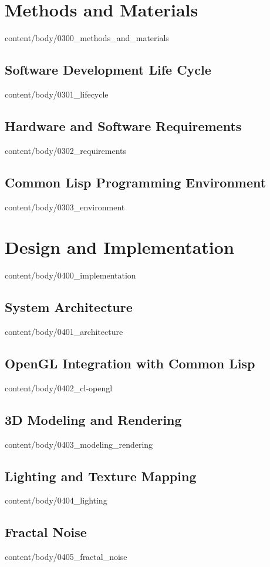 \documentclass[english, tfg, loc, lof, firstnumbered, epsbased]{tfgtfmthesisuam}
\begin{document}
\chapter{Methods and Materials}{content/body/0300_methods_and_materials}            %
  \section{Software Development Life Cycle}{content/body/0301_lifecycle}            %
  \section{Hardware and Software Requirements}{content/body/0302_requirements}      %
  \section{Common Lisp Programming Environment}{content/body/0303_environment}      %

\chapter{Design and Implementation}{content/body/0400_implementation}               %
  \section{System Architecture}{content/body/0401_architecture}                     %
  \section{OpenGL Integration with Common Lisp}{content/body/0402_cl-opengl}        %
  \section{3D Modeling and Rendering}{content/body/0403_modeling_rendering}         %
  \section{Lighting and Texture Mapping}{content/body/0404_lighting}                %
  \section{Fractal Noise}{content/body/0405_fractal_noise}                          %
\end{document}
